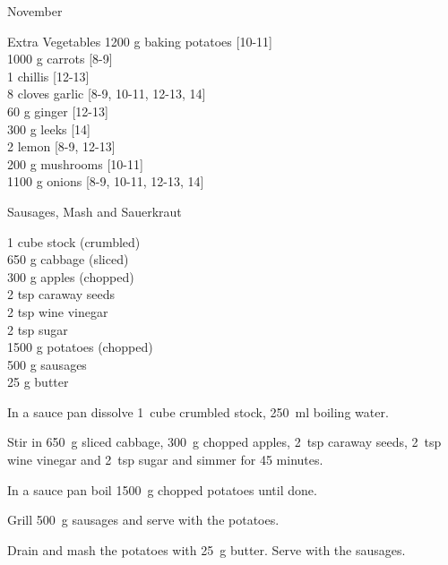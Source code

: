 \begin{menu}{November}
      \begin{shoppinglist}{Extra Vegetables}
      1200 g baking potatoes {\scriptsize[10-11]}\\
      1000 g carrots {\scriptsize[8-9]}\\
      1  chillis {\scriptsize[12-13]}\\
      8 cloves garlic {\scriptsize[8-9, 10-11, 12-13, 14]}\\
      60 g ginger {\scriptsize[12-13]}\\
      300 g leeks {\scriptsize[14]}\\
      2  lemon {\scriptsize[8-9, 12-13]}\\
      200 g mushrooms {\scriptsize[10-11]}\\
      1100 g onions {\scriptsize[8-9, 10-11, 12-13, 14]}\\
      \end{shoppinglist}%
      \par\vfil %
    \vfil\clearpage
  
    \begin{recipe}{2}{Sausages, Mash and Sauerkraut}%
		\begin{ingredients}
		1 cube stock (crumbled) \\
	650 g cabbage (sliced) \\
	300 g apples (chopped) \\
	2 tsp caraway seeds  \\
	2 tsp wine vinegar  \\
	2 tsp sugar  \\
	1500 g potatoes (chopped) \\
	500 g sausages  \\
	25 g butter  \\
	
		\end{ingredients}
	
	
    \begin{instructions}
    \item 
        In a sauce pan dissolve 
        1~cube crumbled stock,
        250~ml  boiling water.
      \item 
        Stir in 
        650~g sliced cabbage,
        300~g chopped apples,
        2~tsp  caraway seeds,
        2~tsp  wine vinegar
        and
        2~tsp  sugar
        and simmer for 45 minutes.
      \item 
        In a sauce pan boil
        1500~g chopped potatoes
        until done.
      \item 
        Grill
        500~g  sausages
        and serve with the potatoes.
      \item 
        Drain and mash the potatoes with
        25~g  butter.
        Serve with the sausages.
      

\end{instructions}
\end{recipe}
\end{menu}
